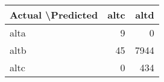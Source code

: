 \begin{tabular}{lrr}
\toprule
Actual \textbackslash   Predicted &  altc &  altd \\
\midrule
               alta &     9 &     0 \\
               altb &    45 &  7944 \\
               altc &     0 &   434 \\
\bottomrule
\end{tabular}
